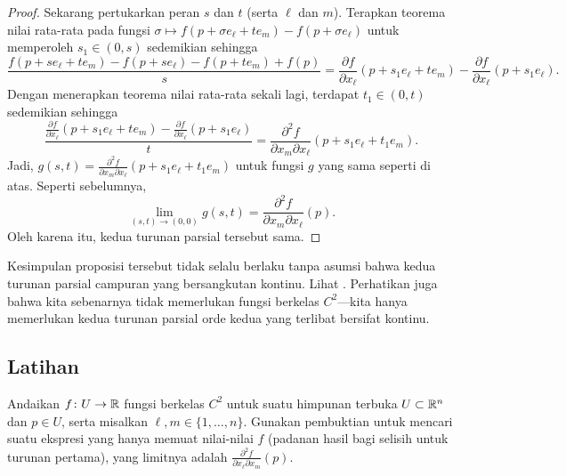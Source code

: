 \begin{proof}
Sekarang pertukarkan peran $s$ dan $t$ (serta $\ell$ dan $m$).
Terapkan teorema nilai rata-rata pada
fungsi $\sigma \mapsto f(p+\sigma e_{\ell} + te_m)-f(p + \sigma
e_{\ell})$ untuk
memperoleh $s_1 \in (0,s)$ sedemikian sehingga
\begin{equation*}
\frac{f(p+ se_{\ell} + te_m )- f(p+s e_{\ell}) - f(p+t e_m)+f(p)}{s}
=
\frac{\partial f}{\partial x_{\ell}}(p + s_1 e_{\ell} + t e_m)
-
\frac{\partial f}{\partial x_{\ell}}(p + s_1 e_{\ell}) .
\end{equation*}
Dengan menerapkan teorema nilai rata-rata sekali lagi, terdapat $t_1 \in (0,t)$ sedemikian sehingga
\begin{equation*}
\frac{\frac{\partial f}{\partial x_{\ell}}(p + s_1 e_{\ell} + t e_m)
-
\frac{\partial f}{\partial x_{\ell}}(p + s_1 e_{\ell})}{t}
=
\frac{\partial^2 f}{\partial x_m \partial x_{\ell}}(p + s_1 e_{\ell} + t_1 e_m) .
\end{equation*}
Jadi, $g(s,t) = \frac{\partial^2 f}{\partial x_m \partial
x_{\ell}}(p + s_1 e_{\ell} + t_1 e_m)$ untuk fungsi $g$ yang sama seperti di atas.
Seperti sebelumnya,
\begin{equation*}
\lim_{(s,t) \to (0,0)} g(s,t) = 
\frac{\partial^2 f}{\partial x_m \partial x_{\ell}}(p) .
\end{equation*}
Oleh karena itu, kedua turunan parsial tersebut sama.
\end{proof}

Kesimpulan proposisi tersebut tidak selalu berlaku tanpa asumsi bahwa kedua turunan parsial campuran
yang bersangkutan kontinu.  Lihat .
Perhatikan juga bahwa kita sebenarnya tidak memerlukan fungsi berkelas $C^2$---kita hanya memerlukan
kedua turunan parsial orde kedua yang terlibat bersifat kontinu.

\subsection{Latihan}

\begin{exercise}
Andaikan $f \colon U \to {\mathbb{R}}$ fungsi berkelas $C^2$ untuk suatu himpunan terbuka $U \subset
{\mathbb{R}}^n$ dan $p \in U$, serta misalkan $\ell,m \in \{1,\ldots,n\}$.
Gunakan pembuktian  untuk mencari suatu ekspresi
yang hanya memuat nilai-nilai $f$ (padanan hasil bagi selisih
untuk turunan pertama), yang limitnya adalah
$\frac{\partial^2 f}{ \partial x_{\ell} \partial x_m}(p)$.
\end{exercise}

